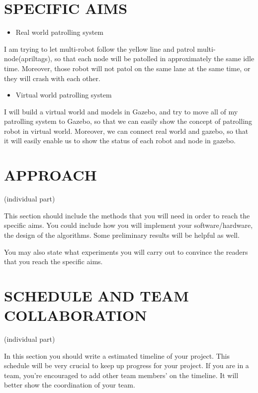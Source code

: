 \documentclass[letterpaper, 10 pt, conference]{ieeeconf}  %
\begin{document}
\section{SPECIFIC AIMS}

\begin{itemize}
\item Real world patrolling system
\end{itemize}
I am trying to let multi-robot follow the yellow line and patrol multi-node(apriltags), so that each node will be patolled in approximately the same idle time. Moreover, those robot will not patol on the same lane at the same time, or they will crash with each other. 

\begin{itemize}
\item Virtual world patrolling system
\end{itemize}
I will build a virtual world and models in Gazebo, and try to move all of my patrolling system to Gazebo, so that we can easily show the concept of patrolling robot in virtual world. Moreover, we can connect real world and gazebo, so that it will easily enable us to show the status of each robot and node in gazebo.

\section{APPROACH}

(individual part)

This section should include the methods that you will need in order to reach the specific aims. You could include how you will implement your software/hardware, the design of the algorithms. Some preliminary results will be helpful as well. 

You may also state what experiments you will carry out to convince the readers that you reach the specific aims.

\section{SCHEDULE AND TEAM COLLABORATION}

(individual part)

In this section you should write a estimated timeline of your project. This schedule will be very crucial to keep up progress for your project. If you are in a team, you're encouraged to add other team members' on the timeline. It will better show the coordination of your team.
   

\addtolength{\textheight}{-12cm}   %



\end{document}
